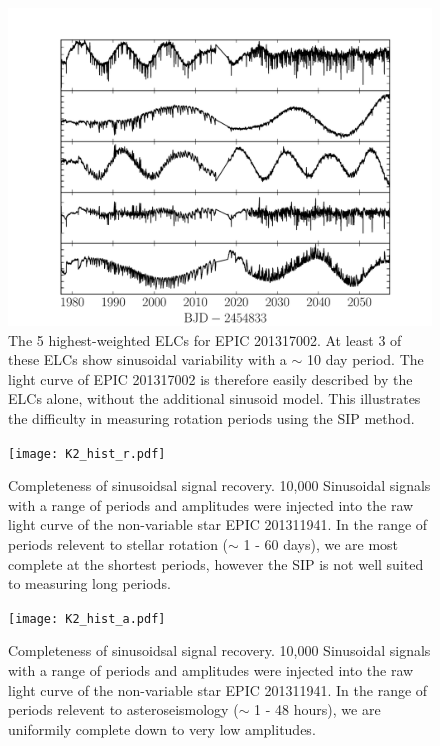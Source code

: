 \documentclass[useAMS, usenatbib, preprint, 12pt]{aastex}
\begin{document}
\begin{figure}
\begin{center}
\includegraphics[width=6in, clip=true]{201317002_top5.pdf}
\caption{The 5 highest-weighted ELCs for EPIC 201317002. At least 3 of these
	ELCs show sinusoidal variability with a $\sim$ 10 day period.
	The light curve of EPIC 201317002 is therefore easily described by the
	ELCs alone, without the additional sinusoid model.
	This illustrates the difficulty in measuring rotation periods using the
	SIP method.}
\label{fig:top5}
\end{center}
\end{figure}

\begin{figure}
\begin{center}
\texttt{[image: K2\_hist\_r.pdf]}
\caption{Completeness of sinusoidsal signal recovery. 10,000 Sinusoidal signals
with a range of periods and amplitudes were injected into the raw light curve
of the non-variable star EPIC 201311941. In the range of periods relevent to
stellar rotation ($\sim$ 1 - 60 days), we are most complete at the shortest
periods, however the SIP is not well suited to measuring long periods.}
\label{fig:K2_hist_r}
\end{center}
\end{figure}

\begin{figure}
\begin{center}
\texttt{[image: K2\_hist\_a.pdf]}
\caption{Completeness of sinusoidsal signal recovery. 10,000 Sinusoidal signals
with a range of periods and amplitudes were injected into the raw light curve
of the non-variable star EPIC 201311941. In the range of periods relevent to
asteroseismology ($\sim$ 1 - 48 hours), we are uniformily complete down to
very low amplitudes.}
\label{fig:K2_hist_a}
\end{center}
\end{figure}
\end{document}
